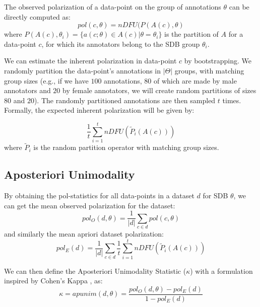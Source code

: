 \documentclass{article}
\begin{document}
The observed polarization of a data-point on the group of annotations $\theta$ can be directly computed as: 
 \begin{equation}
 	pol(c, \theta) = nDFU(P(A(c), \theta)
 \end{equation}
 \noindent where $P(A(c), \theta_i) = \{a(c; \theta) \in A(c) | \theta=\theta_i\}$ is the partition of $A$ for a data-point $c$, for which its annotators belong to the \ac{SDB} group $\theta_i$.
 
 We can estimate the inherent polarization in data-point $c$ by bootstrapping. We randomly partition the data-point's annotations in $\lvert \Theta \rvert$ groups, with matching group sizes (e.g., if we have $100$ annotations, $80$ of which are made by male annotators and $20$ by female annotators, we will create random partitions of sizes $80$ and $20$). The randomly partitioned annotations are then sampled $t$ times. Formally, the expected inherent polarization will be given by:
 
 \begin{equation}
 	\label{eq:pol_expected}
 	\frac{1}{t} \sum_{i=1}^t  \textit{nDFU}(\tilde{P}_i(A(c)))
 \end{equation}
 \noindent where $\tilde{P}_i$ is the random partition operator with matching group sizes.


\subsection{Aposteriori Unimodality}
\label{ssec:methodology:aposteriori}

By obtaining the pol-statistics for all data-points in a dataset $d$ for \ac{SDB} $\theta$, we can get the mean observed polarization for the dataset:
\begin{equation}
	pol_{O}(d, \theta) = \frac{1}{\lvert d \rvert} \sum_{c \in d} pol(c, \theta)
\end{equation} 
\noindent and similarly the mean apriori dataset polarization:
\begin{equation}
	pol_{E}(d) = \frac{1}{\lvert d \rvert} \sum_{c \in d} \frac{1}{t} \sum_{i=1}^t  \textit{nDFU}(\tilde{P}_i(A(c)))
\end{equation}

\noindent We can then define the Aposteriori Unimodality Statistic ($\kappa$) with a formulation inspired by Cohen's Kappa \cite{Cohen_1960}, as:
\begin{equation}
	\kappa = apunim(d, \theta) = \frac{pol_O(d, \theta) - pol_E(d)}{1 - pol_E(d)}
\end{equation}
\end{document}
